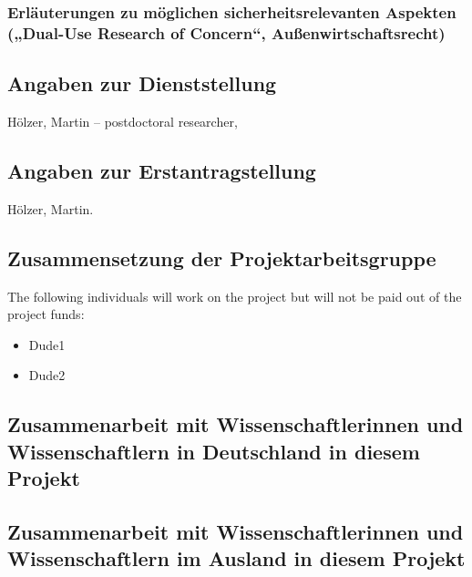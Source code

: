\documentclass{scrartcl}
\begin{document}
\subsubsection{Erläuterungen zu möglichen sicherheitsrelevanten Aspekten („Dual-Use 
Research of Concern``, Außenwirtschaftsrecht)}


\subsection{Angaben zur Dienststellung}
H\"olzer, Martin -- postdoctoral researcher, 

\subsection{Angaben zur Erstantragstellung}
H\"olzer, Martin.

\subsection{Zusammensetzung der Projektarbeitsgruppe}
The following individuals will work on the project but will not be paid out of
the project funds:

\begin{itemize}
\item Dude1
\item Dude2
\end{itemize}

\subsection{Zusammenarbeit mit Wissenschaftlerinnen und Wissenschaftlern in Deutschland in diesem Projekt}

\subsection{Zusammenarbeit mit Wissenschaftlerinnen und Wissenschaftlern im Ausland in diesem Projekt}
\end{document}
